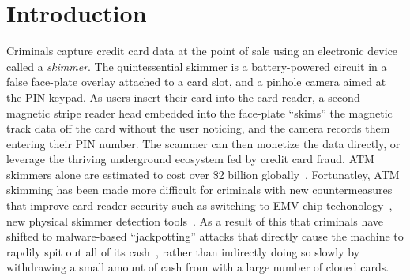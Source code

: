 

%


\section{Introduction}
\label{sec:intro}

Criminals capture credit card data at the point of sale using an electronic
device called a \emph{skimmer}. The quintessential skimmer is a battery-powered
circuit in a false face-plate overlay attached to a card slot, and a pinhole
camera aimed at the PIN keypad.  As users insert their card into the card
reader, a second magnetic stripe reader head embedded into the face-plate
``skims'' the magnetic track data off the card without the user noticing, and
the camera records them entering their PIN number. The scammer can then monetize
the data directly, or leverage the thriving underground ecosystem fed by credit
card fraud. ATM skimmers alone are estimated to cost over \$2 billion
globally~\cite{cnbc-skimmers}. Fortunatley, ATM skimming has been made more
difficult for criminals with new countermeasures that improve card-reader
security such as switching to EMV chip techonology~\cite{atmia-emv-migration},
new physical skimmer detection tools~\cite{skimreaper2018}. As a result of this
that criminals have shifted to malware-based ``jackpotting'' attacks that
directly cause the machine to rapdily spit out all of its
cash~\cite{vancouver-jackpotting}, rather than indirectly doing so slowly by withdrawing a
small amount of cash from with a large number of cloned cards. 

